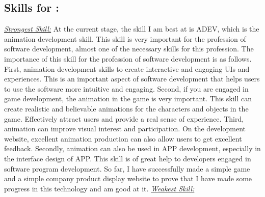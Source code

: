 \documentclass[a4paper, 11pt]{report}
\begin{document}
\subsection{Skills for \majC: \studA}
\underline{\emph{Strongest Skill:}}\newline
At the current stage, the skill I am best at is ADEV\cite{SFIA}, which is the animation development skill. This skill is very important for the profession of software development, almost one of the necessary skills for this profession. The importance of this skill for the profession of software development is as follows. First, animation development skills to create interactive and engaging UIs and experiences. This is an important aspect of software development that helps users to use the software more intuitive and engaging. Second, if you are engaged in game development, the animation in the game is very important. This skill can create realistic and believable animations for the characters and objects in the game. Effectively attract users and provide a real sense of experience. Third, animation can improve visual interest and participation. On the development website, excellent animation production can also allow users to get excellent feedback. Secondly, animation can also be used in APP development, especially in the interface design of APP. This skill is of great help to developers engaged in software program development. So far, I have successfully made a simple game and a simple company product display website to prove that I have made some progress in this technology and am good at it.
\newline\newline
\underline{\emph{Weakest Skill:}}\newline
\end{document}
